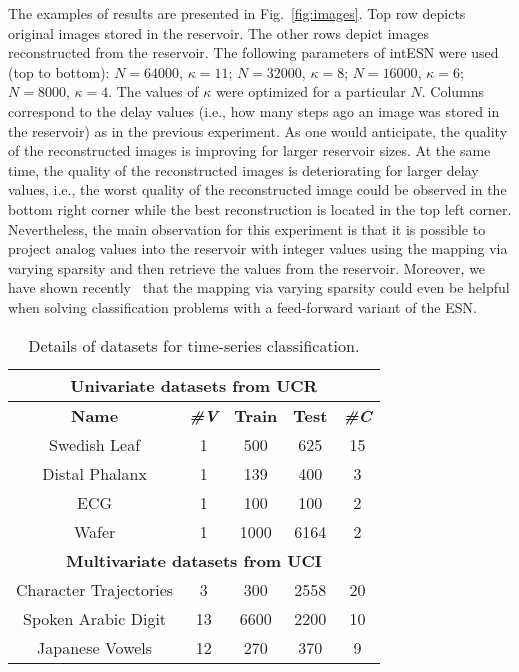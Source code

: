 The examples of results are presented in Fig.~\ref{fig:images}. Top row depicts original images stored in the reservoir. The other rows depict images reconstructed from the reservoir. The following parameters of intESN were used (top to bottom): $N=64000$, $\kappa=11$; $N=32000$, $\kappa=8$;  $N=16000$, $\kappa=6$;  $N=8000$, $\kappa=4$. The values of $\kappa$ were optimized for a particular $N$. Columns correspond to the delay values (i.e., how many steps ago an image was stored in the reservoir) as in the previous experiment. 
As one would anticipate, the quality of the reconstructed images is improving for larger reservoir sizes. At the same time, the quality of the reconstructed images is deteriorating for larger delay values, i.e., the worst quality of the reconstructed image could be observed in the bottom right corner while the best reconstruction is located in the top left corner.
Nevertheless, the main observation for this experiment is that it is possible to project analog values into the reservoir with integer values using the mapping via varying sparsity and then retrieve the values from the reservoir.
Moreover, we have shown recently~\cite{intRVFL} that the mapping via varying sparsity could even be helpful when solving classification problems with a feed-forward variant of the ESN.

\begin{table}[tb]%
\renewcommand{\arraystretch}{1.3}
\caption{Details of datasets for time-series classification.\label{tab:datasets}
\vspace{-2mm}}
    \begin{center}
    \begin{tabular}{|c|c|c|c|c|}\hline
      	\multicolumn{5}{|c|}{\textbf{Univariate datasets from UCR}} \\ \hline\hline
        \textbf{Name} & \textit{\textbf{\#V}} & \textbf{Train} & \textbf{Test} & \textit{\textbf{\#C}} \\ \hline
        Swedish Leaf 	& 1	& 500 	& 625 	& 15 \\ \hline  
 	Distal Phalanx & 1	& 139 & 400 &	3 \\ \hline
	ECG 		& 1 	& 100 & 100 &	2 \\ \hline	
        Wafer  		& 1 	& 1000	 & 6164 &	2\\ \hline\hline       
        \multicolumn{5}{|c|}{\textbf{Multivariate datasets from UCI}} \\ \hline\hline
	 Character Trajectories & 3 		& 300 & 2558 & 20  \\\hline
	 Spoken Arabic Digit 	 & 13 	& 6600 & 2200 & 10  \\\hline
        Japanese Vowels 	& 12 	& 270 & 370 & 9 \\ \hline    	
    \end{tabular}
    \end{center}
\end{table}


